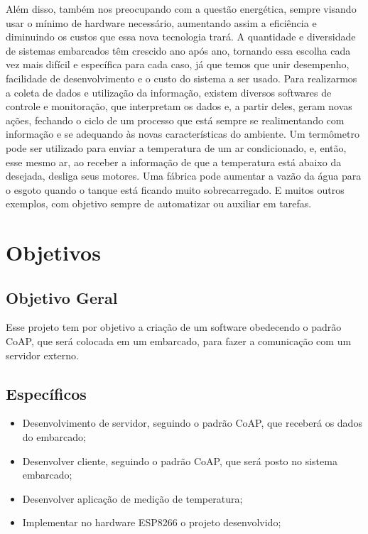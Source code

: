 	Além disso, também nos preocupando com a questão energética, sempre visando usar o mínimo de hardware necessário, aumentando assim a eficiência e diminuindo os custos que essa nova tecnologia trará. A quantidade e diversidade de sistemas embarcados têm crescido ano após ano, tornando essa escolha cada vez mais difícil e específica para cada caso, já que temos que unir desempenho, facilidade de desenvolvimento e o custo do sistema a ser usado. Para realizarmos a coleta de dados e utilização da informação, existem diversos softwares de controle e monitoração, que interpretam os dados e, a partir deles, geram novas ações, fechando o ciclo de um processo que está sempre se realimentando com informação e se adequando às novas características do ambiente. Um termômetro pode ser utilizado para enviar a temperatura de um ar condicionado, e, então, esse mesmo ar, ao receber a informação de que a temperatura está abaixo da desejada, desliga seus motores. Uma fábrica pode aumentar a vazão da água para o esgoto quando o tanque está ficando muito sobrecarregado. E muitos outros exemplos, com objetivo sempre de automatizar ou auxiliar em tarefas.

\section{Objetivos}

\subsection{Objetivo Geral}

Esse projeto tem por objetivo a criação de um software obedecendo o padrão CoAP, que será colocada em um embarcado, para fazer a comunicação com um servidor externo.

\subsection{Específicos}
\begin{itemize}
	\item Desenvolvimento de servidor, seguindo o padrão CoAP, que receberá os dados do embarcado;
	\item Desenvolver cliente, seguindo o padrão CoAP, que será posto no sistema embarcado;
	\item Desenvolver aplicação de medição de temperatura;
	\item Implementar no hardware ESP8266 o projeto desenvolvido;
\end{itemize}

